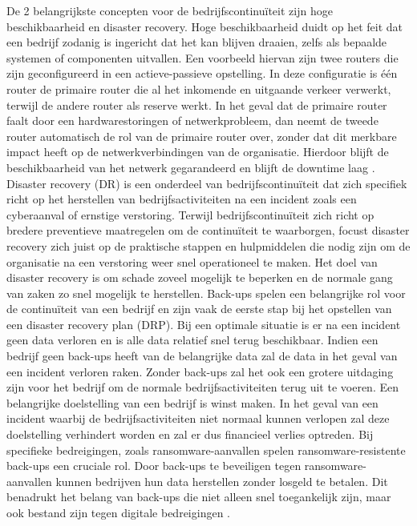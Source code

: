 De 2 belangrijkste concepten voor de bedrijfscontinuïteit zijn hoge beschikbaarheid en disaster recovery. Hoge beschikbaarheid duidt op het feit dat een bedrijf zodanig is ingericht dat het kan blijven draaien, zelfs als bepaalde systemen of componenten uitvallen. Een voorbeeld hiervan zijn twee routers die zijn geconfigureerd in een actieve-passieve opstelling. In deze configuratie is één router de primaire router die al het inkomende en uitgaande verkeer verwerkt, terwijl de andere router als reserve werkt. In het geval dat de primaire router faalt door een hardwarestoringen of netwerkprobleem, dan neemt de tweede router automatisch de rol van de primaire router over, zonder dat dit merkbare impact heeft op de netwerkverbindingen van de organisatie. Hierdoor blijft de beschikbaarheid van het netwerk gegarandeerd en blijft de downtime laag \autocite{Zhu2015}. Disaster recovery (DR) is een onderdeel van bedrijfscontinuïteit dat zich specifiek richt op het herstellen van bedrijfsactiviteiten na een incident zoals een cyberaanval of ernstige verstoring. Terwijl bedrijfscontinuïteit zich richt op bredere preventieve maatregelen om de continuïteit te waarborgen, focust disaster recovery zich juist op de praktische stappen en hulpmiddelen die nodig zijn om de organisatie na een verstoring weer snel operationeel te maken. Het doel van disaster recovery is om schade zoveel mogelijk te beperken en de normale gang van zaken zo snel mogelijk te herstellen. Back-ups spelen een belangrijke rol voor de continuïteit van een bedrijf en zijn vaak de eerste stap bij het opstellen van een disaster recovery plan (DRP). Bij een optimale situatie is er na een incident geen data verloren en is alle data relatief snel terug beschikbaar. Indien een bedrijf geen back-ups heeft van de belangrijke data zal de data in het geval van een incident verloren raken. Zonder back-ups zal het ook een grotere uitdaging zijn voor het bedrijf om de normale bedrijfsactiviteiten terug uit te voeren. Een belangrijke doelstelling van een bedrijf is winst maken. In het geval van een incident waarbij de bedrijfsactiviteiten niet normaal kunnen verlopen zal deze doelstelling verhindert worden en zal er dus financieel verlies optreden. Bij specifieke bedreigingen, zoals ransomware-aanvallen spelen ransomware-resistente back-ups een cruciale rol. Door back-ups te beveiligen tegen ransomware-aanvallen kunnen bedrijven hun data herstellen zonder losgeld te betalen. Dit benadrukt het belang van back-ups die niet alleen snel toegankelijk zijn, maar ook bestand zijn tegen digitale bedreigingen \autocite{Ghazi2013}.

